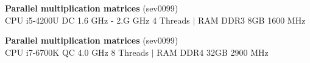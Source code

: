 \documentclass[11pt,landscape]{article}
\begin{document}
\pagestyle{empty}
\begin{center}
\textbf{\huge{Parallel multiplication matrices}} \Large{(sev0099)} \\
\LARGE{CPU i5-4200U DC 1.6 GHz - 2.G GHz 4 Threads $|$ RAM DDR3 8GB 1600 MHz}
\end{center}

\begin{table}[H]
\centering

\end{table}
\begin{table}[H]
\centering

\end{table}

\begin{center}
\textbf{\huge{Parallel multiplication matrices}} \Large{(sev0099)} \\
\LARGE{CPU i7-6700K QC 4.0 GHz 8 Threads $|$ RAM DDR4 32GB 2900 MHz}
\end{center}

\begin{table}[H]
\centering

\end{table}
\begin{table}[H]
\centering

\end{table}
\end{document}
